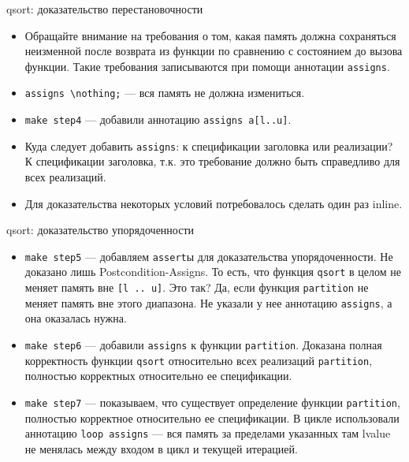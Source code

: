 \documentclass[hyperref={unicode=true}]{beamer}
\begin{document}
    \begin{frame}{qsort: доказательство перестановочности}
    \begin{itemize}
    \item Обращайте внимание на требования о том, какая память должна сохраняться неизменной после возврата из функции
    по сравнению с состоянием до вызова функции. Такие требования записываются при помощи аннотации \texttt{assigns}.
    \item \texttt{assigns \textbackslash nothing;} --- вся память не должна измениться.
    \item \texttt{make step4} --- добавили аннотацию \texttt{assigns a[l..u]}.
    \item Куда следует добавить \texttt{assigns}: к спецификации заголовка или реализации? К спецификации заголовка, т.к. это
    требование должно быть справедливо для всех реализаций.
    \item Для доказательства некоторых условий потребовалось сделать один раз inline.
    \end{itemize}
    \end{frame}

    \begin{frame}{qsort: доказательство упорядоченности}
    \begin{itemize}
    \item \texttt{make step5} --- добавляем \texttt{assert}ы для доказательства упорядоченности.
    Не доказано лишь Postcondition-Assigns. То есть, что функция \texttt{qsort} в целом не меняет память вне
    \texttt{[l .. u]}. Это так? Да, если функция \texttt{partition} не меняет память вне этого диапазона. Не указали у нее
    аннотацию \texttt{assigns}, а она оказалась нужна.
    \item \texttt{make step6} --- добавили \texttt{assigns} к функции \texttt{partition}. Доказана полная корректность функции \texttt{qsort}
    относительно всех реализаций \texttt{partition}, полностью корректных относительно ее спецификации.
    \item \texttt{make step7} --- показываем, что существует определение функции \texttt{partition}, полностью корректное
    относительно ее спецификации. В цикле использовали аннотацию \texttt{loop assigns} --- вся память за пределами указанных там lvalue
    не менялась между входом в цикл и текущей итерацией.
    \end{itemize}
    \end{frame}
\end{document}
